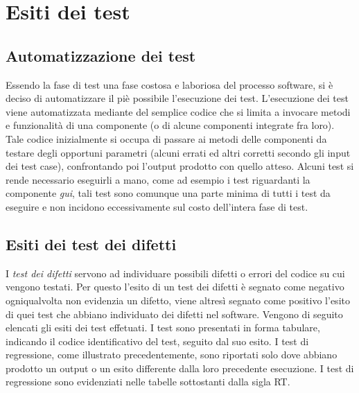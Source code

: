 \chapter{Esiti dei test}
\section{Automatizzazione dei test}
Essendo la fase di test una fase costosa e laboriosa del processo software, si \`e deciso di automatizzare il pi\`e possibile l'esecuzione dei test. L'esecuzione dei test viene automatizzata mediante del semplice codice che si limita a invocare metodi e funzionalit\`a di una componente (o di alcune componenti integrate fra loro). Tale codice inizialmente si occupa di passare ai metodi delle componenti da testare degli opportuni parametri (alcuni errati ed altri corretti secondo gli input dei test case), confrontando poi l'output prodotto con quello atteso.
Alcuni test si rende necessario eseguirli a mano, come ad esempio i test riguardanti la componente \textit{gui}, tali test sono comunque una parte minima di tutti i test da eseguire e non incidono eccessivamente sul costo dell'intera fase di test.
\section{Esiti dei test dei difetti}
I \textit{test dei difetti} servono ad individuare possibili difetti o errori del codice su cui vengono testati. Per questo l'esito di un test dei difetti \`e segnato come negativo ogniqualvolta non evidenzia un difetto, viene altres\`i segnato come positivo l'esito di quei test che abbiano individuato dei difetti nel software.
Vengono di seguito elencati gli esiti dei test effetuati. I test  sono presentati in forma tabulare, indicando il codice identificativo del test, seguito dal suo esito. I test di regressione, come illustrato precedentemente, sono riportati solo dove abbiano prodotto un output o un esito differente dalla loro precedente esecuzione. I test di regressione sono evidenziati nelle tabelle sottostanti dalla sigla RT.


